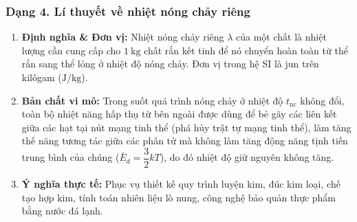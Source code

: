 \subsubsection{Dạng 4. Lí thuyết về nhiệt nóng chảy riêng}
\begin{phuongphap}
\begin{enumerate}
\item \textbf{Định nghĩa & Đơn vị:} Nhiệt nóng chảy riêng $\lambda$ của một chất là nhiệt lượng cần cung cấp cho $1\ \mathrm{kg}$ chất rắn kết tinh để nó chuyển hoàn toàn từ thể rắn sang thể lỏng ở nhiệt độ nóng chảy. Đơn vị trong hệ SI là jun trên kilôgam ($\mathrm{J/kg}$).
\item \textbf{Bản chất vi mô:} Trong suốt quá trình nóng chảy ở nhiệt độ $t_{\text{nc}}$ không đổi, toàn bộ nhiệt năng hấp thụ từ bên ngoài được dùng để bẻ gãy các liên kết giữa các hạt tại nút mạng tinh thể (phá hủy trật tự mạng tinh thể), làm tăng thế năng tương tác giữa các phân tử mà không làm tăng động năng tịnh tiến trung bình của chúng ($\bar{E}_d = \dfrac{3}{2}kT$), do đó nhiệt độ giữ nguyên không tăng.
\item \textbf{Ý nghĩa thực tế:} Phục vụ thiết kế quy trình luyện kim, đúc kim loại, chế tạo hợp kim, tính toán nhiên liệu lò nung, công nghệ bảo quản thực phẩm bằng nước đá lạnh.
\end{enumerate}
\end{phuongphap}

